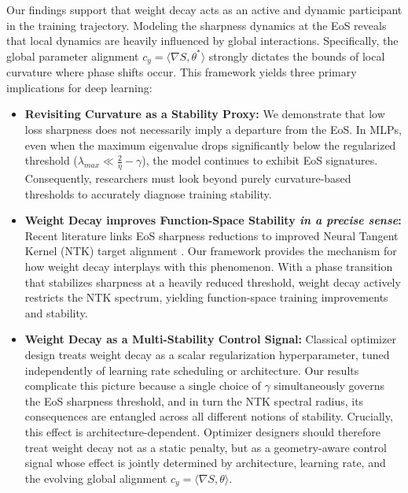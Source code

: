 \documentclass{article}
\begin{document}
Our findings support that weight decay acts as an active and dynamic participant in the training trajectory. Modeling the sharpness dynamics at the EoS reveals that local dynamics are heavily influenced by global interactions. Specifically, the global parameter alignment $c_y = \langle \nabla S, \theta^* \rangle$ strongly dictates the bounds of local curvature where phase shifts occur. This framework yields three primary implications for deep learning:
\begin{itemize}[leftmargin=1em,itemsep=0.6em,topsep=0.15em,parsep=0pt]
    \item \textbf{Revisiting Curvature as a Stability Proxy:} We demonstrate that low loss sharpness does not necessarily imply a departure from the EoS. In MLPs, even when the maximum eigenvalue drops significantly below the regularized threshold ($\lambda_{max} \ll \frac{2}{\eta} - \gamma$), the model continues to exhibit EoS signatures. Consequently, researchers must look beyond purely curvature-based thresholds to accurately diagnose training stability.
    
    \item \textbf{Weight Decay improves Function-Space Stability \textit{in a precise sense}:} Recent literature links EoS sharpness reductions to improved Neural Tangent Kernel (NTK) target alignment \citep{ntk_eos}. Our framework provides the mechanism for how weight decay interplays with this phenomenon. With a phase transition that stabilizes sharpness at a heavily reduced threshold, weight decay actively restricts the NTK spectrum, yielding function-space training improvements and stability.
    
    \item \textbf{Weight Decay as a Multi-Stability Control Signal:} Classical optimizer design treats weight decay as a scalar regularization hyperparameter, tuned independently of learning rate scheduling or architecture. Our results complicate this picture because a single choice of $\gamma$ simultaneously governs the EoS sharpness threshold, and in turn the NTK spectral radius, its consequences are entangled across all different notions of stability. Crucially, this effect is architecture-dependent. Optimizer designers should therefore treat weight decay not as a static penalty, but as a geometry-aware control signal whose effect is jointly determined by architecture, learning rate, and the evolving global alignment $c_y = \langle \nabla S, \theta \rangle$.

\end{itemize}
\end{document}
